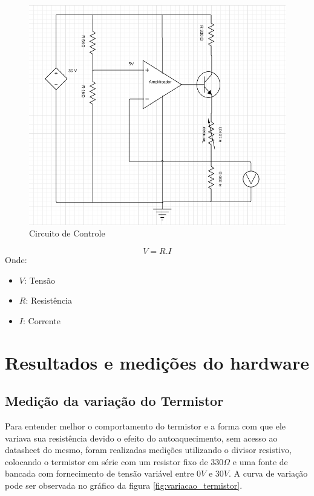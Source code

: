 \begin{figure}[h!]
	\begin{center}
		\includegraphics[width=1\linewidth]{images/Circuito_de_controle.png}
		\caption{Circuito de Controle}
		\label{fig:circuitoRealimentado}
	\end{center}
\end{figure}
\FloatBarrier

\begin{equation} \label{eq:leideohm}
V = R.I
\end{equation}
Onde:
\begin{itemize}[label=]
	\item $V$: Tensão
	\item $R$: Resistência
	\item $I$: Corrente
\end{itemize}

\section{Resultados e medições do hardware}

\subsection{Medição da variação do Termistor}

Para entender melhor o comportamento do termistor e a forma com que ele variava sua resistência devido o efeito do autoaquecimento, sem acesso ao datasheet do mesmo, foram realizadas medições utilizando o divisor resistivo, colocando o termistor em série com um resistor fixo de $330\Omega$ e uma fonte de bancada com fornecimento de tensão variável entre $0V$ e $30V$. A curva de variação pode ser observada no gráfico da figura \ref{fig:variacao_termistor}.

